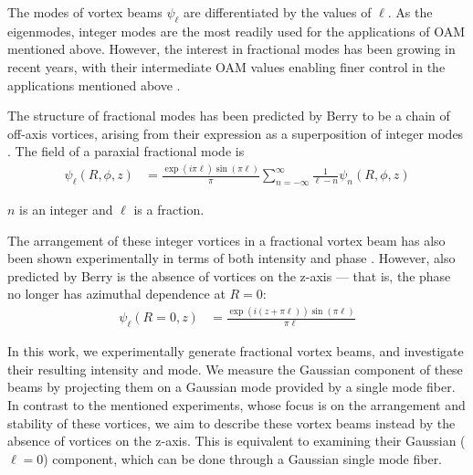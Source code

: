 \documentclass[10pt,a4paper,twoside]{article}
\renewcommand{\P}[1]{\left( #1 \right)}
\renewcommand{\l}{\ell}
\begin{document}
The modes of vortex beams $\psi_\l$ are differentiated by the values of $\l$. As the eigenmodes, integer modes are the most readily used for the applications of OAM mentioned above. However, the interest in fractional modes has been growing in recent years, with their intermediate OAM values enabling finer control in the applications mentioned above \cite{rev}.

The structure of fractional modes has been predicted by Berry to be a chain of off-axis vortices, arising from their expression as a superposition of integer modes \cite{Berry}. The field of a paraxial fractional mode is
 \begin{align}
  \psi_\l (R, \phi, z) &= \frac{\exp\P{i\pi \l} \sin\P{\pi \l}}{\pi}
  \sum_{n=-\infty}^{\infty} \frac{1}{\l - n} \psi_n (R, \phi, z)
\end{align}\label{eq:parax}

\noindent $n$ is an integer and $\l$ is a fraction.

The arrangement of these integer vortices in a fractional vortex beam has also been shown experimentally in terms of both intensity and phase \cite{exp-struc, fiber-struc}. However, also predicted by Berry is the absence of vortices on the z-axis \cite{Berry} --- that is, the phase no longer has azimuthal dependence at $R=0$:
\begin{align}
     \psi_\l (R=0, z) &= \frac{\exp\P{i(z + \pi \l)} \sin\P{\pi \l}}{\pi \l}
\end{align}\label{eq:vortz}

In this work, we experimentally generate fractional vortex beams, and investigate their resulting intensity and mode. We measure the Gaussian component of these beams by projecting them on a Gaussian mode provided by a single mode fiber. In contrast to the mentioned experiments, whose focus is on the arrangement and stability of these vortices, we aim to describe these vortex beams instead by the absence of vortices on the z-axis. This is equivalent to examining their Gaussian ($\l=0$) component, which can be done through a Gaussian single mode fiber.
\end{document}
